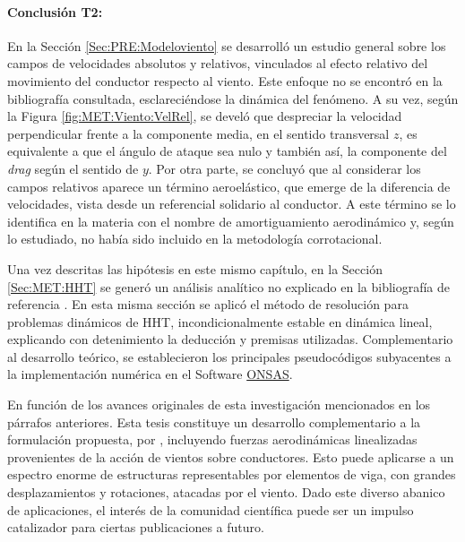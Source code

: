 \paragraph*{Conclusión T2:}
En la Sección \ref{Sec:PRE:Modeloviento} se desarrolló un estudio general sobre los campos de velocidades absolutos y relativos, vinculados al efecto relativo del movimiento del conductor respecto al viento. Este enfoque no se encontró en la bibliografía consultada, esclareciéndose la dinámica del fenómeno. A su vez, según la Figura \ref{fig:MET:Viento:VelRel}, se develó que despreciar la velocidad perpendicular frente a la componente media, en el sentido transversal $z$,  es equivalente a que el ángulo de ataque sea nulo y también así, la componente del \textit{drag} según el sentido de $y$. Por otra parte, se concluyó que al considerar los campos relativos aparece un término aeroelástico, que emerge de la diferencia de velocidades, vista desde un referencial solidario al conductor. A este término se lo identifica en la materia con el nombre de amortiguamiento aerodinámico y, según lo estudiado, no había sido incluido en la metodología corrotacional. 

Una vez descritas las hipótesis en este mismo capítulo, en la Sección \ref{Sec:MET:HHT} se generó un análisis analítico no explicado en la bibliografía de referencia \citep{Le2014}. En esta misma sección se aplicó el método de resolución para problemas dinámicos de HHT, incondicionalmente estable en dinámica lineal, explicando con detenimiento la deducción y premisas utilizadas. Complementario al desarrollo teórico, se establecieron los principales pseudocódigos subyacentes a la implementación numérica en el Software \href{https://github.com/ONSAS/ONSAS.m/}{ONSAS}.

En función de los avances originales de esta investigación mencionados en los párrafos anteriores. Esta tesis constituye un desarrollo complementario a la formulación propuesta, por \cite{Le2014}, incluyendo fuerzas aerodinámicas linealizadas provenientes de la acción de vientos sobre conductores. Esto puede aplicarse a un espectro enorme de estructuras representables por elementos de viga, con grandes desplazamientos y rotaciones, atacadas por el viento. Dado este diverso abanico de aplicaciones, el interés de la comunidad científica puede ser un impulso catalizador para ciertas publicaciones a futuro.


